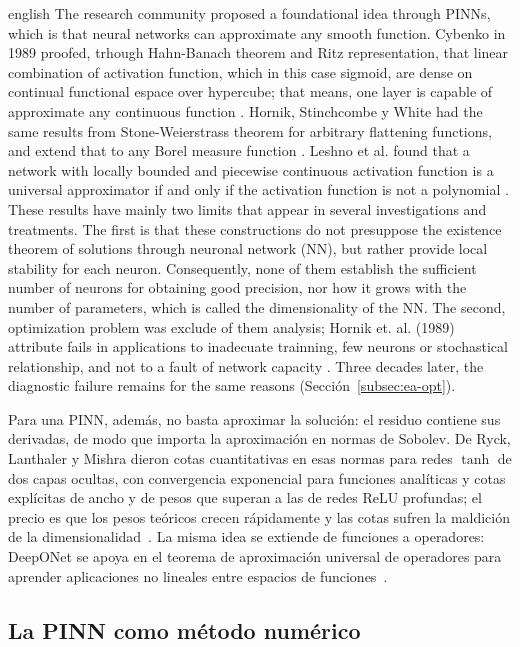 \documentclass[../0000.tex]{subfiles}
\begin{document}
\begin{hyphenrules}{english}
The research community proposed a foundational idea through PINNs, which is that neural networks can approximate any smooth function. Cybenko in 1989 proofed, trhough 
Hahn-Banach theorem and Ritz representation, that linear combination of activation function, which in this case sigmoid, are dense on continual functional espace 
over hypercube; that means, one layer is capable of approximate any continuous function \cite{cybenko1989}. Hornik, Stinchcombe y White had the same results from 
Stone-Weierstrass theorem for arbitrary flattening functions, and extend that to any Borel measure function \cite{hornik1989}. Leshno et al. found that a network 
with locally bounded and piecewise continuous activation function is a universal approximator if and only if the activation function is not a polynomial \cite{leshno1993}. 
These results have mainly two limits that appear in several investigations and treatments. The first is that these constructions do not presuppose the existence 
theorem of solutions through neuronal network (NN), but rather provide local stability for each neuron. Consequently, none of them establish the sufficient 
number of neurons for obtaining good precision, nor how it grows with the number of parameters, which is called the dimensionality of the NN. The second, optimization 
problem was exclude of them analysis; Hornik et. al. (1989) attribute fails in applications to inadecuate trainning, few neurons or stochastical relationship, and 
not to a fault of network capacity \cite{hornik1989}. Three decades later, the diagnostic failure remains for the same reasons (Sección~\ref{subsec:ea-opt}).

Para una PINN, además, no basta aproximar la solución: el residuo contiene sus derivadas, de modo que importa la aproximación en normas de Sobolev. De Ryck, 
Lanthaler y Mishra dieron cotas cuantitativas en esas normas para redes $\tanh$ de dos capas ocultas, con convergencia exponencial para funciones analíticas y 
cotas explícitas de ancho y de pesos que superan a las de redes ReLU profundas; el precio es que los pesos teóricos crecen rápidamente y las cotas sufren la 
maldición de la dimensionalidad~\cite{deryck2021tanh}. La misma idea se extiende de funciones a operadores: DeepONet se apoya en el teorema de aproximación 
universal de operadores para aprender aplicaciones no lineales entre espacios de funciones~\cite{lu2021deeponet}.

\subsection{La PINN como método numérico}
\label{subsec:ea-numerico}


\end{hyphenrules}
\end{document}
